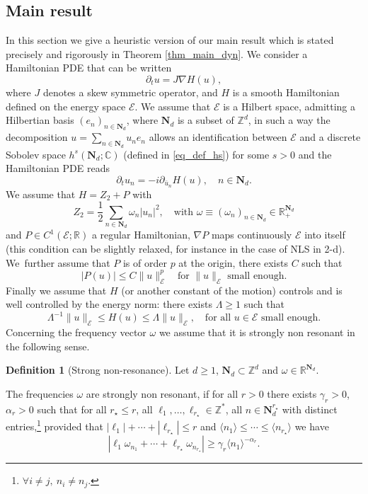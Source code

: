 \documentclass[JEP,XML,SOM,Unicode,NoEqCountersInSection,published]{cedram}
\theoremstyle{definition}
\newtheorem{definition}[theorem]{Definition}
\begin{document}
\subsection{Main result}
In this section we give a heuristic version of our main result which is stated precisely and rigorously in Theorem \ref{thm_main_dyn}.
We consider a Hamiltonian PDE that can be written
\[
\partial_t u=J\nabla H(u),
\]
where $J$ denotes a skew symmetric operator, and $H$ is a smooth Hamiltonian defined on the energy space $\mathcal E$. We assume that $\mathcal E$ is a Hilbert space, admitting a Hilbertian basis $(e_n)_{n\in \mathbf{N}_d}$, where $\mathbf{N}_d$ is a subset of $\mathbb{Z}^d$, in such a way the decomposition $u=\sum_{n\in \mathbf{N}_d}u_ne_n $ allows an identification between $\mathcal E$ and a discrete Sobolev space $h^s(\mathbf{N}_d;\mathbb{C})$ (defined in \eqref{eq_def_hs}) for some $s>0$ and the Hamiltonian PDE reads
\[
\partial_t u_n =-i \partial_{\bar u_n}H(u),\quad n\in \mathbf{N}_d.
\]
We assume that $H=Z_2+P$ with
\[
Z_2=\frac12\sum_{n\in\mathbf{N}_d}\omega_n |u_n|^2,\quad \text{with }\omega\equiv(\omega_n)_{n\in\mathbf{N}_d }\in \mathbb{R}_{+}^{\mathbf{N}_d}
\]
and $P\in C^1(\mathcal E;\mathbb{R})$ a regular Hamiltonian, \ie $\nabla P$ maps continuously $\mathcal E$ into itself (this condition can be slightly relaxed, for instance in the case of NLS in 2-d). We~further assume that $P$ is of order $p$ at the origin, \ie there exists $C$ such that
\begin{equation}\label{P}|P(u)|\leq C\| u\|_{\mathcal{E}}^p\quad \text{for } \|u\|_{\mathcal{E}} \text{ small enough.} \end{equation} Finally we assume that $H$ (or another constant of the motion) controls and is well controlled by the energy norm: there exists $\Lambda \geq 1$ such that
\begin{equation}\label{Lambda}\Lambda^{-1}\| u\|_{\mathcal{E}} \leq H(u)\leq \Lambda \|u\|_{\mathcal{E}},\quad \text{for all }u\in{\mathcal{E}} \text{ small enough.}\end{equation}
Concerning the frequency vector $\omega$ we assume that it is strongly non resonant in the following sense.
\begin{definition}[Strong non-resonance]
\label{def_SNR} Let $d\geq 1$, $\mathbf{N}_d \subset \mathbb{Z}^d$ and $\omega \in \mathbb{R}^{\mathbf{N}_d}$.

The frequencies $\omega$ are strongly non resonant, if for all $r>0$ there exists $\gamma_r>0$, $\alpha_r>0$ such that for all $r_\star \leq r$, all $\ell_1,\dots,\ell_{r_\star} \in \mathbb{Z}^*$, all $n \in \mathbf{N}_d^{r_\star}$ with distinct entries,\footnote{\ie $\forall i\neq j,\ n_i\neq n_j$.} provided that $|\ell_1|+\cdots+|\ell_{r_\star}| \leq r$ and $\langle n_1 \rangle \leq \cdots \leq \langle n_{r_\star} \rangle$ we have
\begin{equation}
\label{eq_est_NR}
|\ell_1 \omega_{n_1} + \cdots + \ell_{r_\star} \omega_{n_{r_\star}} | \geq \gamma_{r} \langle n_1 \rangle^{-\alpha_r}.
\end{equation}
\end{definition}
\end{document}
